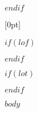 \documentclass[
$if(fontsize)$
  $fontsize$,
$endif$
  a4paper
]{scrartcl}
\begin{document}
\newpage
\setlength{\parindent}{\udfparindent}
$endif$



\renewcommand*\contentsname{目录}
{ 

[0pt]{\addvspace{4mm}\filright}
{\bfseries\contentspush{\bfseries{\thecontentslabel}\hspace{1.2mm}\ }}
{}{\hspace*{0.3em}\textbf{\contentspage}}

\setcounter{tocdepth}{3}
\tableofcontents
\newpage
}

$if(lof)$
\listoffigures
\newpage
$endif$


$if(lot)$
\listoftables
\newpage
$endif$




\setcounter{page}{1}

\setcounter{table}{0}

$body$
\end{document}
